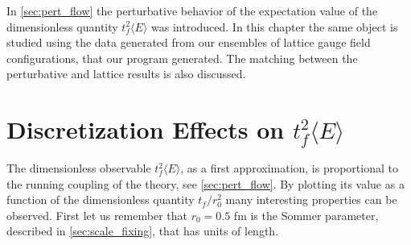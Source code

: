 In \cref{sec:pert_flow} the perturbative behavior of the expectation value of the dimensionless quantity  $t_f^2\langle E \rangle$ was introduced. In this chapter the same object is studied using the data generated from our ensembles of lattice gauge field configurations, that our program generated. The matching between the perturbative and lattice results is also discussed.

\section{Discretization Effects on $t_f^2\langle E \rangle$}
\label{sec:scale}
The dimensionless observable $t_f^2\langle E \rangle$, as a first approximation, is proportional to the running coupling of the theory, see \cref{sec:pert_flow}. By plotting its value  as a function of the dimensionless quantity $t_f/r_0^2$ many interesting properties can be observed. First let us remember that $r_0=0.5$ fm is the Sommer parameter, described in \cref{sec:scale_fixing}, that has units of length.


